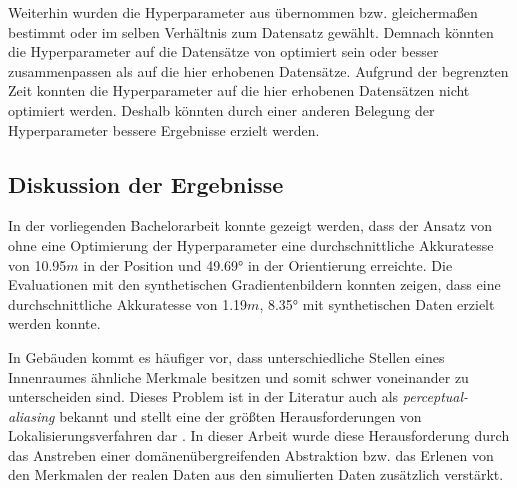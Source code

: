 Weiterhin wurden die Hyperparameter aus \citet{acharyaBIMPoseNetIndoorCamera2019} übernommen bzw. gleichermaßen bestimmt oder im selben Verhältnis zum Datensatz gewählt. Demnach könnten die Hyperparameter auf die Datensätze von \citet{acharyaBIMPoseNetIndoorCamera2019} optimiert sein oder besser zusammenpassen als auf die hier erhobenen Datensätze. Aufgrund der begrenzten Zeit konnten die Hyperparameter auf die hier erhobenen Datensätzen nicht optimiert werden. Deshalb könnten durch einer anderen Belegung der Hyperparameter bessere Ergebnisse erzielt werden.

\subsection{Diskussion der Ergebnisse}



In der vorliegenden Bachelorarbeit konnte gezeigt werden, dass der Ansatz von \citet{acharyaBIMPoseNetIndoorCamera2019} ohne eine Optimierung der Hyperparameter eine durchschnittliche Akkuratesse von 10.95$m$ in der Position und 49.69° in der Orientierung erreichte. Die Evaluationen mit den synthetischen Gradientenbildern konnten zeigen, dass eine durchschnittliche Akkuratesse von 1.19$m$, 8.35° mit synthetischen Daten erzielt werden konnte.



In Gebäuden kommt es häufiger vor, dass unterschiedliche Stellen eines Innenraumes ähnliche Merkmale besitzen und somit schwer voneinander zu unterscheiden sind. Dieses Problem ist in der Literatur auch als \textit{perceptual-aliasing} bekannt und stellt eine der größten Herausforderungen von Lokalisierungsverfahren dar \cite{lowryVisualPlaceRecognition2016}. In dieser Arbeit wurde diese Herausforderung durch das Anstreben einer domänenübergreifenden Abstraktion bzw. das Erlenen von den Merkmalen der realen Daten aus den simulierten Daten zusätzlich verstärkt.


